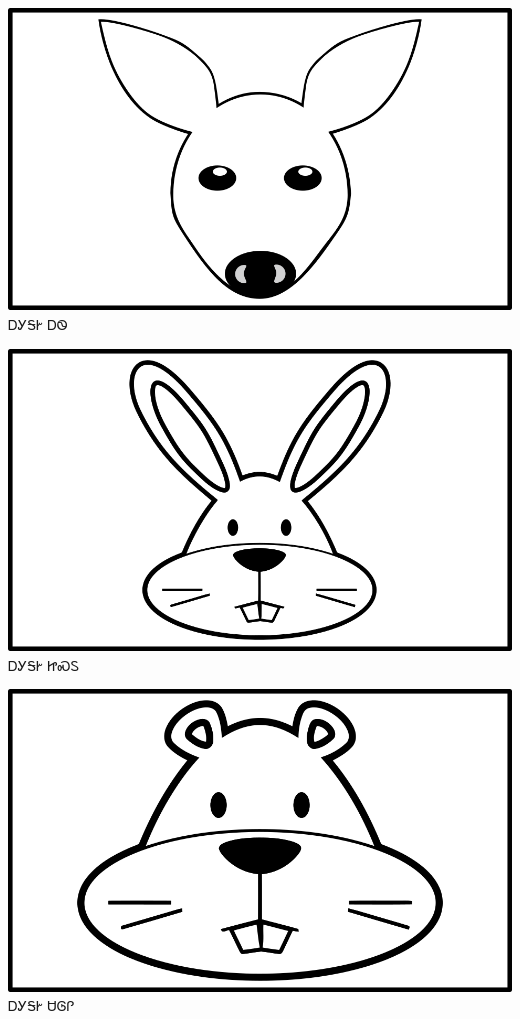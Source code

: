 \documentclass[avery5371]{flashcards}%
\begin{document}
    \begin{flashcard}{
        \includegraphics[width=0.95\columnwidth,height=.51\columnwidth,keepaspectratio]{../artwork/objects-animate/ahwi}
    }
        \Huge ᎠᎩᎦᎨ ᎠᏫ
    \end{flashcard}

    \begin{flashcard}{
        \includegraphics[width=0.95\columnwidth,height=.51\columnwidth,keepaspectratio]{../artwork/objects-animate/jisdu}
    }
        \Huge ᎠᎩᎦᎨ ᏥᏍᏚ
    \end{flashcard}

    \begin{flashcard}{
        \includegraphics[width=0.95\columnwidth,height=.51\columnwidth,keepaspectratio]{../artwork/objects-animate/saloli}
    }
        \Huge ᎠᎩᎦᎨ ᏌᎶᎵ
    \end{flashcard}
\end{document}
